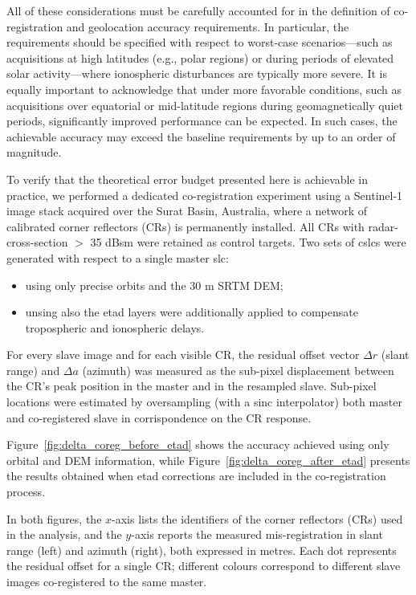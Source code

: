All of these considerations must be carefully accounted for in the definition of co-registration and geolocation accuracy requirements. In particular, the requirements should be specified with respect to worst-case scenarios—such as acquisitions at high latitudes (e.g., polar regions) or during periods of elevated solar activity—where ionospheric disturbances are typically more severe. It is equally important to acknowledge that under more favorable conditions, such as acquisitions over equatorial or mid-latitude regions during geomagnetically quiet periods, significantly improved performance can be expected. In such cases, the achievable accuracy may exceed the baseline requirements by up to an order of magnitude.


To verify that the theoretical error budget presented here is achievable in practice, we performed a dedicated co-registration experiment using a Sentinel-1 image stack acquired over the Surat Basin, Australia, where a network of calibrated corner reflectors (CRs) is permanently installed.  All CRs with radar-cross-section \(>\) 35 dBsm were retained as control targets. Two sets of \acs{cslc}s were generated with respect to a single master \acs{slc}:  
\begin{itemize}
    \item using only precise orbits and the 30 m SRTM DEM;   
    \item unsing also the \acs{etad} layers were additionally applied to compensate tropospheric and ionospheric delays.
\end{itemize}

For every slave image and for each visible CR, the residual offset vector \(\Delta r\) (slant range) and \(\Delta a\) (azimuth) was measured as the sub-pixel displacement between the CR’s peak position in the master and in the resampled slave.  Sub-pixel locations were estimated by oversampling (with a sinc interpolator) both master and co-registered slave in corrispondence on the CR response.

Figure~\ref{fig:delta_coreg_before_etad} shows the accuracy achieved using only orbital and DEM information, while Figure~\ref{fig:delta_coreg_after_etad} presents the results obtained when \acs{etad} corrections are included in the co-registration process.

In both figures, the $x$-axis lists the identifiers of the corner reflectors (CRs) used in the analysis, and the $y$-axis reports the measured mis-registration in slant range (left) and azimuth (right), both expressed in metres.
Each dot represents the residual offset for a single CR; different colours correspond to different slave images co-registered to the same master.

